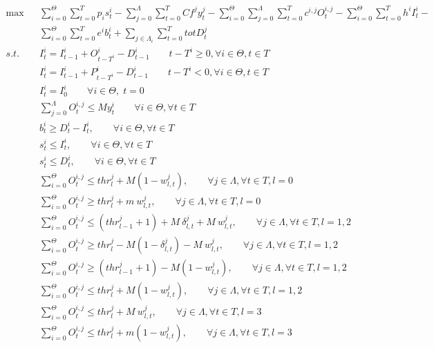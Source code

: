 \documentclass{article}
\begin{document}
\begin{eqnarray}
\max && \sum_{i=0}^\Theta \sum_{t=0}^T p_i  s_t^i - \sum_{j=0}^\Lambda \sum_{t=0}^T Cf^j  y_t^j - \sum_{i=0}^\Theta \sum_{j=0}^\Lambda \sum_{t=0}^T c^{i,j} O_t^{i,j} -
\sum_{i=0}^\Theta \sum_{t=0}^T h^i I_t^i-  \\ & &
\sum_{i=0}^\Theta \sum_{t=0}^T e^i b_t^i +
\sum_{j \in {\Lambda}_i} \sum_{t=0}^T totD_t^j
\label{EQPB:objts} \\
s.t. && I_t^i=I_{t-1}^i+O_{t-T^i}^i - D_{t-1}^i \qquad t-T^i \geq 0, \forall i \in \Theta, t \in T \label{EQPB:inventory} \\
&& I_t^i=I_{t-1}^i+P_{t-T^i}^i - D_{t-1}^i \qquad t-T^i < 0, \forall i \in \Theta,  t \in T \label{EQPB:inventory_preorder} \\
&& I_t^i=I_{0}^i \qquad \forall i \in \Theta,\; t=0 \label{EQPB:init_inventory} \\
&& \sum_{j=0}^\Lambda O_t^{i,j} \leq M y_t^i \qquad \forall i \in \Theta,  \forall t  \in T\\
&& b_t^{i} \geq D_{t}^i - I_t^i, \qquad \forall i \in \Theta,  \forall t  \in T  \label{EQPB:b}\\
&& s_t^i \leq I_t^i, \qquad \forall i \in \Theta,  \forall t  \in T\\
&& s_t^i \leq D_t^i, \qquad \forall i \in \Theta,  \forall t  \in T\\
&& \sum_{i=0}^\Theta O^{i,j}_t \leq thr^j_l + M (1 - w^j_{l,t}), \qquad \forall j  \in \Lambda, \forall t  \in T, l=0\\
&& \sum_{i=0}^\Theta O^{i,j}_t \geq thr^j_l + m \ w^j_{l,t}, \qquad \forall j \in \Lambda, \forall t  \in T, l=0\\
&& \sum_{i=0}^\Theta O^{i,j}_t \leq (thr^j_{l-1}+1) + M \ \delta^j_{l,t} + M \ w^j_{l,t}, \qquad \forall j \in \Lambda, \forall t  \in T, l=1,2\\
&& \sum_{i=0}^\Theta O^{i,j}_t \geq thr^j_l - M (1-\delta^j_{l,t}) - M \ w^j_{l,t}, \qquad \forall j \in \Lambda, \forall t  \in T, l=1,2\\
&& \sum_{i=0}^\Theta O^{i,j}_t \geq (thr^j_{l-1}+1) - M (1 - w^j_{l,t}), \qquad \forall j \in \Lambda, \forall t  \in T,l=1,2\\
&& \sum_{i=0}^\Theta O^{i,j}_t \leq thr^j_l + M (1- w^j_{l,t}), \qquad \forall j \in \Lambda, \forall t  \in T, l=1,2\\
&& \sum_{i=0}^\Theta O^{i,j}_t \leq thr^j_l + M \ w^j_{l,t}, \qquad \forall j \in \Lambda, \forall t  \in T, l=3\\
&& \sum_{i=0}^\Theta O^{i,j}_t \leq thr^j_l + m (1 - w^j_{l,t}), \qquad \forall j \in \Lambda, \forall t  \in T, l=3\\

\end{eqnarray}
\end{document}

